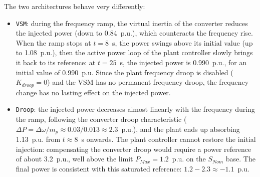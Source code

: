 \documentclass[a4paper, 12pt]{report}
\begin{document}
The two architectures behave very differently:
\begin{itemize}
\item \texttt{VSM}: during the frequency ramp, the virtual inertia of the converter reduces the injected power (down to 0.84~p.u.), which counteracts the frequency rise. When the ramp stops at $t = 8$~s, the power swings above its initial value (up to 1.08~p.u.), then the active power loop of the plant controller slowly brings it back to its reference: at $t = 25$~s, the injected power is 0.990~p.u., for an initial value of 0.990~p.u. Since the plant frequency droop is disabled ($K_{droop} = 0$) and the VSM has no permanent frequency droop, the frequency change has no lasting effect on the injected power.
\item \texttt{Droop}: the injected power decreases almost linearly with the frequency during the ramp, following the converter droop characteristic ($\Delta P = \Delta\omega / m_p \approx 0.03 / 0.013 \approx 2.3$~p.u.), and the plant ends up absorbing 1.13~p.u. from $t \approx 8$~s onwards.
The plant controller cannot restore the initial injection: compensating the converter droop would require a power reference of about 3.2~p.u., well above the limit $P_{Max} = 1.2$~p.u.  on the $S_{Nom}$ base. The final power is consistent with this saturated reference: $1.2 - 2.3 \approx -1.1$~p.u.
\end{itemize}
\end{document}
